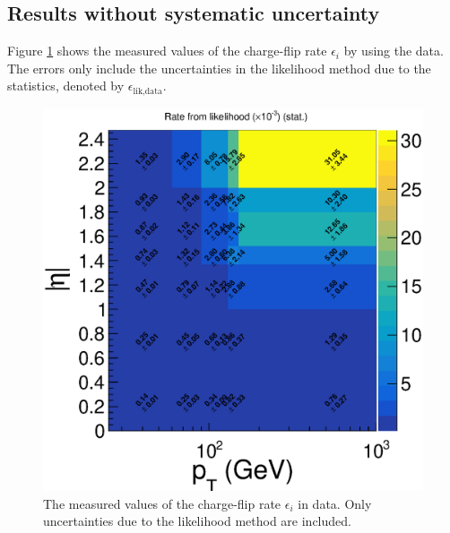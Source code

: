 \subsection{Results without systematic uncertainty}
\label{sec:results_stat}
Figure \ref{fig:charge_flip_data_stat} shows the measured values of the charge-flip rate $\epsilon_i$ by using the data.
The errors only include the uncertainties in the likelihood method due to the statistics, denoted by $\epsilon_{\text{lik,data}}$.

\begin{figure}
\centering
\includegraphics[width=\textwidth]{data/plot/charge_flip/FitPlots/data_cf_rate_stat.eps}
\caption{The measured values of the charge-flip rate $\epsilon_i$ in data. Only uncertainties due to the likelihood method are included.}
\label{fig:charge_flip_data_stat}
\end{figure}

